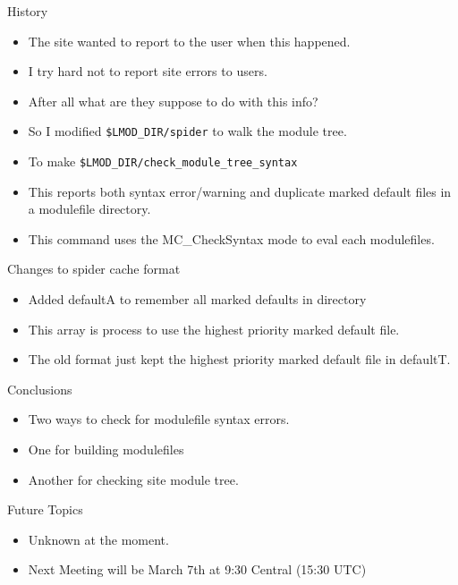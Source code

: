 \documentclass{beamer}
\begin{document}
\begin{frame}{History}
  \begin{itemize}
    \item The site wanted to report to the user when this happened.
    \item I try hard not to report site errors to users.
    \item After all what are they suppose to do with this info?
    \item So I modified \texttt{\$LMOD\_DIR/spider} to walk the module
      tree.
    \item To make \texttt{\$LMOD\_DIR/check\_module\_tree\_syntax}
    \item This reports both syntax error/warning and duplicate marked
      default files in a modulefile directory.
    \item This command uses the MC\_CheckSyntax mode to eval each modulefiles.
  \end{itemize}
\end{frame}

\begin{frame}{Changes to spider cache format}
  \begin{itemize}
    \item Added defaultA to remember all marked defaults in directory
    \item This array is process to use the highest priority marked
      default file.
    \item The old format just kept the highest priority marked default
      file in defaultT.
  \end{itemize}
\end{frame}

\begin{frame}{Conclusions}
  \begin{itemize}
    \item Two ways to check for modulefile syntax errors.
    \item One for building modulefiles
    \item Another for checking site module tree.
  \end{itemize}
\end{frame}

\begin{frame}{Future Topics}
  \begin{itemize}
    \item Unknown at the moment.
    \item Next Meeting will be March 7th at 9:30 Central (15:30 UTC)
  \end{itemize}
\end{frame}
\end{document}
